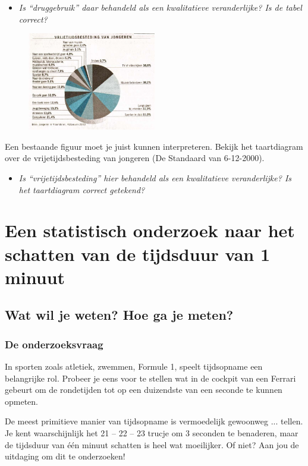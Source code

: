 \documentclass[11pt]{article}
\newcommand{\vraag}[2]{\begin{itemize}\item {\it #1} \vspace*{#2}\end{itemize}}
\begin{document}
\vraag{Is “druggebruik” daar behandeld als een kwalitatieve veranderlijke? Is de tabel correct?}{4cm}

\begin{figure}
  \vspace*{-1cm}
  \includegraphics[width=0.5\textwidth]{cirkeldiagram-vrijetijdsbesteding}
\end{figure}

Een bestaande figuur moet je juist kunnen interpreteren. Bekijk het taartdiagram over de
vrijetijdsbesteding van jongeren (De Standaard van 6-12-2000).

\vraag{Is “vrijetijdsbesteding” hier behandeld als een kwalitatieve veranderlijke? Is het taartdiagram correct getekend?}{4cm}

\newpage

\section{Een statistisch onderzoek naar het schatten van de tijdsduur van 1 minuut}

\subsection{Wat wil je weten? Hoe ga je meten?}

\subsubsection{De onderzoeksvraag}

In sporten zoals atletiek, zwemmen, Formule 1, speelt tijdsopname een belangrijke rol. Probeer je
eens voor te stellen wat in de cockpit van een Ferrari gebeurt om de rondetijden tot op een duizendste
van een seconde te kunnen opmeten.

De meest primitieve manier van tijdsopname is vermoedelijk gewoonweg ... tellen. Je kent
waarschijnlijk het 21 – 22 – 23 trucje om 3 seconden te benaderen, maar de tijdsduur van één minuut
schatten is heel wat moeilijker. Of niet? Aan jou de uitdaging om dit te onderzoeken!
\end{document}
